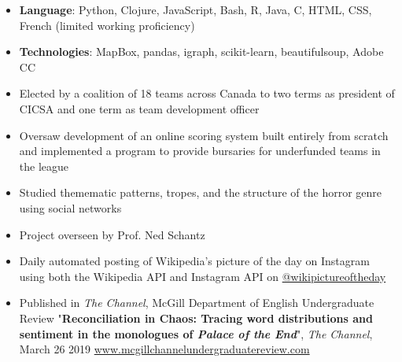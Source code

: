 \begin{itemize}
\item \textbf{Language}: Python, Clojure, JavaScript, Bash, R, Java, C, HTML, CSS, French (limited working proficiency)
\item \textbf{Technologies}: MapBox, pandas, igraph, scikit-learn, beautifulsoup, Adobe CC
\end{itemize}


\begin{itemize}
\item Elected by a coalition of 18 teams across Canada to two terms as president of CICSA and one term as team development officer
\item Oversaw development of an online scoring system built entirely from scratch and implemented a program to provide bursaries for underfunded teams in the league
\end{itemize}

\begin{itemize}
\item  Studied themematic patterns, tropes, and the structure of the horror genre using social networks
\item Project overseen by Prof. Ned Schantz
\end{itemize}
\begin{itemize}
\item Daily automated posting of Wikipedia's picture of the day on Instagram using both the Wikipedia API and Instagram API on \href{http://instagram.com/wikipictureoftheday}{@wikipictureoftheday}
\end{itemize}


\begin{itemize}
\item  Published in \textit{The Channel}, McGill Department of English Undergraduate Review "\textbf{Reconciliation in Chaos: Tracing word distributions and sentiment in the monologues of \textit{Palace of the End}}", \textit{The Channel}, March 26 2019 \href{http://mcgillchannelundergraduatereview.com/2019/03/reconciliation-in-chaos-tracing-word-distributions-and-sentiment-in-the-monologues-of-palace-of-the-end/}{www.mcgillchannelundergraduatereview.com}
\end{itemize}
